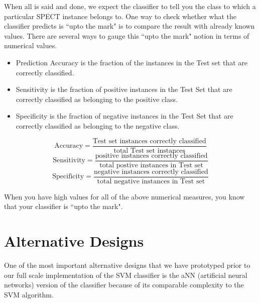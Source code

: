 \documentclass[11pt,a4paper]{report}
\begin{document}
{When all is said and done, we expect the classifier to tell you the class to which a particular SPECT instance belongs to. One way to check whether what the classifier predicts is ``upto the mark" is to compare the result with already known values. There are several ways to gauge this ``upto the mark" notion in terms of numerical values. \\
\bigskip
\begin{itemize}
\item Prediction Accuracy is the fraction of the instances in the Test set that are correctly classified.\\        
\item Sensitivity is the fraction of positive instances in the Test Set that are correctly classified as belonging to the positive class.\\
\item Specificity is the fraction of negative instances in the Test Set that are correctly classified as belonging to the negative class.\\
\end{itemize}
\begin{equation}\text{Accuracy} = \frac{\text{Test set instances correctly classified}}{\text{total Test set instances}}\end{equation}
\begin{equation}\text{Sensitivity} = \frac{\text{positive instances correctly classified}}{\text{total postive instances in Test set}}\end{equation}
\begin{equation}\text{Specificity} = \frac{\text{negative instances correctly classified}}{\text{total negative instances in Test set}}\end{equation}

\bigskip

When you have high values for all of the above numerical measures, you know that your classifier is ``upto the mark".


\chapter{Alternative Designs}
\vspace{-0.5cm}
One of the most important alternative designs that we have prototyped prior to our full scale implementation of the SVM classifier is the aNN (artificial neural networks) version of the classifier because of its comparable complexity to the SVM algorithm.\\

}
\end{document}

